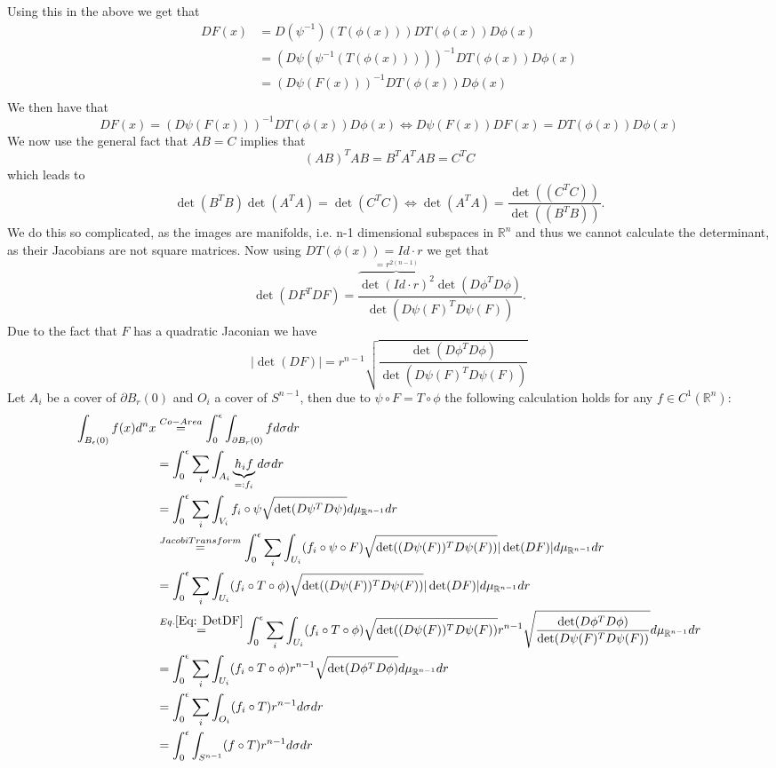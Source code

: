 \documentclass[A4,12pt,twoside]{book}
\begin{document}
{\[\]
Using this in the above we get that
\begin{align*}
DF(x) & = D(\psi^{-1})(T(\phi(x)) ) DT(\phi(x)) D\phi (x) \\
&= (D\psi ( \psi^{-1}(T(\phi(x)) ) ) )^{-1} DT(\phi(x)) D\phi (x) \\
&= (D\psi ( F(x) ))^{-1} DT(\phi(x)) D\phi (x) \\
\end{align*}
We then have that 
\[
DF(x) = (D\psi ( F(x) ))^{-1} DT(\phi(x)) D\phi (x)  \iff D\psi ( F(x) )  DF(x) =  DT(\phi(x)) D\phi (x) 
\]
We now use the general fact that $AB=C$ implies that
\[
( AB )^T AB = B^T A^T AB =C^T C \]
which leads to
\[
\det (B^T B) \det(A^T A) = \det (C^T C) \iff \det (A^T A) = \frac{\det((C^T C))}{\det ((B^T B))}.
\]
We do this so complicated, as the images are manifolds, i.e. n-1 dimensional subspaces in $\mathbb{R}^n$ and thus we cannot calculate the determinant, as their Jacobians are not square matrices. Now using $D T(\phi (x)) = Id \cdot r $ we get that
\[
\det(DF^T DF) = \frac{ \overbrace{\det (Id \cdot r)^2}^{=r^{2(n-1)}} \det ( D\phi^T D\phi) }{ \det ( D \psi (F) ^T D \psi (F)  ) }.
\]
Due to the fact that $F$ has a quadratic Jaconian we have 
\begin{equation}
\label{Eq: DetDF}
| \det(DF) |= r^{n-1} \sqrt{ \frac{\det ( D\phi^T D\phi) }{ \det ( D \psi (F) ^T D \psi (F)  ) } }
\end{equation}
Let $A_i$ be a cover of $\partial B_r (0)$ and $O_i$ a cover of $S^{n-1}$, then due to $\psi \circ F= T \circ \phi $ the following calculation holds for any $f \in C^1 (\mathbb{R}^n)$:
\begin{align*}
    \int_{B_\epsilon (0)} f(x) d^n x &\stackrel{Co-Area}{=} \int_0^\epsilon \int_{\partial B_r (0)} f d \sigma dr \\
    &= \int_0^\epsilon \sum_i \int_{A_i} \underbrace{h_i f}_{=:f_i} d \sigma dr \\
    &= \int_0^\epsilon \sum_i \int_{V_i} f_i \circ \psi \sqrt{ \det ( D\psi^T D\psi) } d\mu_{\mathbb{R}^{n-1}} dr \\
   & \stackrel{JacobiTransform}{=} \int_0^\epsilon \sum_i \int_{U_i} (f_i \circ \psi \circ F) \sqrt{ \det ( (D\psi(F))^T D\psi(F)) } |\det (DF)|  d\mu_{\mathbb{R}^{n-1}} dr \\
   &= \int_0^\epsilon \sum_i \int_{U_i} (f_i \circ T \circ \phi) \sqrt{ \det ( (D\psi(F))^T D\psi(F)) } |\det (DF)|  d\mu_{\mathbb{R}^{n-1}} dr \\
   &\stackrel{Eq. \ref{Eq: DetDF}}{=} \int_0^\epsilon \sum_i \int_{U_i} (f_i \circ T \circ \phi) \sqrt{ \det ( (D\psi(F))^T D\psi(F)) }  r^{n-1} \sqrt{ \frac{\det ( D\phi^T D\phi) }{ \det ( D \psi (F) ^T D \psi (F)  ) } } d\mu_{\mathbb{R}^{n-1}} dr \\
   &= \int_0^\epsilon \sum_i \int_{U_i} (f_i \circ T \circ \phi)   r^{n-1} \sqrt{ \det ( D\phi^T D\phi) }  d\mu_{\mathbb{R}^{n-1}} dr \\
   &= \int_0^\epsilon \sum_i \int_{O_i} (f_i \circ T)   r^{n-1}   d\sigma dr \\
   &= \int_0^\epsilon  \int_{S^{n-1}} (f \circ T)   r^{n-1}   d\sigma dr \\
\end{align*}

}
\end{document}
